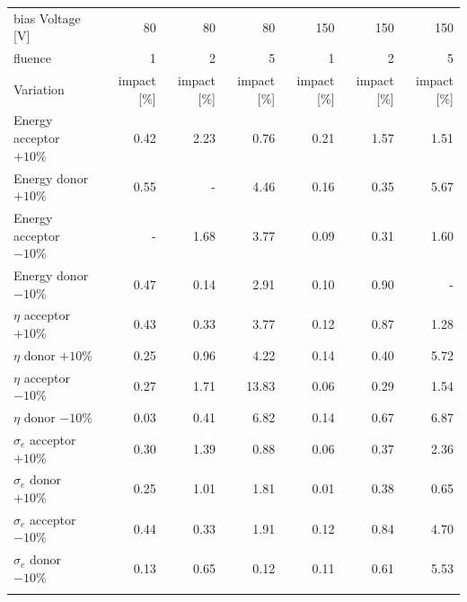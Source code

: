 \begin{table}[!htpb]
\begin{center}
\setlength{\tabcolsep}{0.0pc}
{\tiny
\begin{tabular*}{0.7\textwidth}{@{\extracolsep{\fill}}lrrrrrr}
\noalign{\smallskip}\hline\noalign{\smallskip}
bias Voltage [V]		& 80 & 80 & 80& 150 & 150 &150\\
fluence 					& 1 & 2 & 5 & 1 & 2 & 5\\
\noalign{\smallskip}\hline\noalign{\smallskip}

Variation 				& impact [\%] & impact [\%] & impact [\%] & impact [\%]& impact [\%] & impact [\%]\\
\noalign{\smallskip}\hline\hline\noalign{\smallskip}

Energy acceptor $+10\%$   		& 0.42  	& 2.23  &0.76 & 0.21 & 1.57   &1.51  \\
Energy donor $+10\%$  			& 0.55  	&  -    & 4.46 & 0.16 & 0.35  &5.67\\
Energy acceptor $-10\%$  		& - 		&  1.68 & 3.77& 0.09  & 0.31  & 1.60 \\
Energy donor $-10\%$			& 0.47  	& 0.14  & 2.91 & 0.10  & 0.90 & -\\
\noalign{\smallskip}\hline\noalign{\smallskip}


$\eta$  acceptor $+10\%$  		& 0.43  	& 0.33   & 3.77   & 0.12  & 0.87  &1.28\\
$\eta$  donor $+10\%$  			& 0.25  	& 0.96   & 4.22   & 0.14  & 0.40  &5.72\\
$\eta$  acceptor $-10\%$  		& 0.27  	& 1.71   & 13.83 & 0.06  & 0.29   &1.54 \\
$\eta$  donor $-10\%$ 			& 0.03 	& 0.41   & 6.82   & 0.14  & 0.67   &6.87\\
\noalign{\smallskip}\hline\noalign{\smallskip}

$\sigma_e$ acceptor $+10\%$  	& 0.30		& 1.39   & 0.88 & 0.06 & 0.37  & 2.36\\
$\sigma_e$  donor $+10\%$  		& 0.25  	& 1.01   & 1.81 & 0.01 & 0.38   & 0.65 \\
$\sigma_e$  acceptor $-10\%$  	& 0.44  	& 0.33   &1.91 & 0.12  & 0.84   &4.70\\
$\sigma_e$  donor $-10\%$ 			& 0.13  	& 0.65   & 0.12 & 0.11 & 0.61  &5.53 \\

\noalign{\smallskip}\hline\noalign{\smallskip}


\end{tabular*}}
\end{center}
\end{table}
